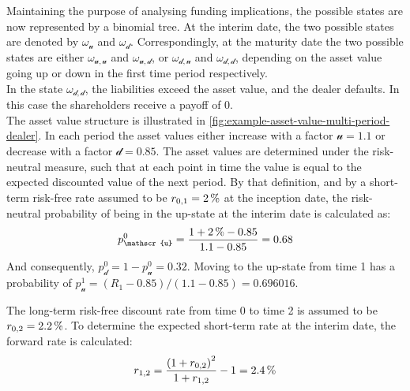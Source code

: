 \documentclass[main.tex]{subfiles}
\begin{document}
        Maintaining the purpose of analysing funding implications,
        the possible states are now represented by a binomial tree.
        At the interim date, the two possible states are denoted by $\omega_\mathscr{u}$ and $\omega_\mathscr{d}$.
        Correspondingly, at the maturity date the two possible states are either
        $\omega_{\mathscr{u},\mathscr{u}}$ and $\omega_{\mathscr{u},\mathscr{d}}$,
        or $\omega_{\mathscr{d},\mathscr{u}}$ and $\omega_{\mathscr{d},\mathscr{d}}$,
        depending on the asset value going up or down in the first time period respectively.
        \\
        In the state $\omega_{\mathscr{d},\mathscr{d}}$, the liabilities exceed the asset value,
        and the dealer defaults.
        In this case the shareholders receive a payoff of 0.
        \\
        The asset value structure is illustrated in 
        \cref{fig:example-asset-value-multi-period-dealer}.
        In each period the asset values either increase with a factor $\mathscr{u} = \num{1.1}$
        or decrease with a factor $\mathscr{d} = \num{0.85}$.
        The asset values are determined under the risk-neutral measure,
        such that at each point in time the value is equal to the expected discounted value of the next period.
        By that definition, and by a short-term risk-free rate assumed to be $r_{0,1}=\pct{0.02}$ at the inception date,
        the risk-neutral probability of being in the up-state at the interim date is calculated as:
        \begin{equation*}
            p_{\mathscr{u}}^{0} =
            \frac{
                \num{1} + \pct{0.02} - \num{0.85}
            }{
                \num{1.1} - \num{0.85}
            }
            = \num{0.68}
        \end{equation*}
        And consequently, $p_{\mathscr{d}}^{0} = 1 - p_{\mathscr{u}}^{0} = \num{0.32}$.
        Moving to the up-state from time 1 has a probability of
        $p^1_\mathscr{u}=(R_1-\num{0.85})/(\num{1.1}-\num{0.85}) = \num{0.696016}$.

        The long-term risk-free discount rate from time 0 to time 2 is assumed to be $r_{0,2}=\pct{0.022}$.
        To determine the expected short-term rate at the interim date, the forward rate is calculated:
        \begin{equation*}
            r_{1,2} =
                \frac{
                    \left(\num{1} + r_{0,2}\right)^{2}
                }{
                    \num{1} + r_{1,2}
                }
            - \num{1}
            = \pct{0.024}
        \end{equation*}
        
\end{document}
